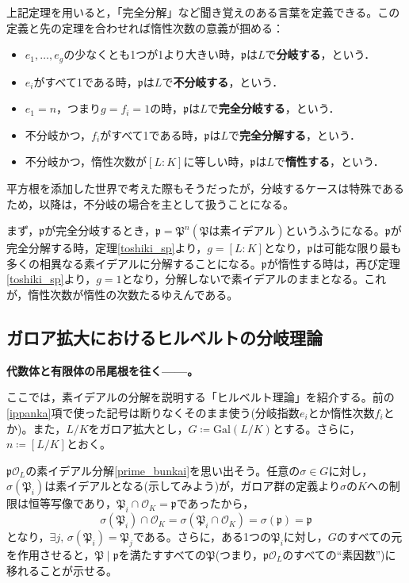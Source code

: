 上記定理を用いると，「完全分解」など聞き覚えのある言葉を定義できる。この定義と先の定理を合わせれば惰性次数の意義が掴める：
\begin{dfn}[聞き覚えのある用語 ＋「分岐」]
    \begin{itemize}
        \item $e_1,\ldots,e_g$の少なくとも1つが1より大きい時，$\mathfrak{p}$は$L$で\textbf{分岐する}，という．
        \item $e_i$がすべて1である時，$\mathfrak{p}$は$L$で\textbf{不分岐する}，という．
        \item $e_1=n$，つまり$g=f_i=1$の時，$\mathfrak{p}$は$L$で\textbf{完全分岐する}，という．
        \item 不分岐かつ，$f_i$がすべて1である時，$\mathfrak{p}$は$L$で\textbf{完全分解する}，という．
        \item 不分岐かつ，惰性次数が$[L:K]$に等しい時，$\mathfrak{p}$は$L$で\textbf{惰性する}，という．
    \end{itemize}
\end{dfn}
平方根を添加した世界で考えた際もそうだったが，分岐するケースは特殊であるため，以降は，不分岐の場合を主として扱うことになる。

まず，$\mathfrak{p}$が完全分岐するとき，$\mathfrak{p}=\mathfrak{P}^{n}(\mathfrak{P}\text{は素イデアル})$というふうになる。$\mathfrak{p}$が完全分解する時，定理\ref{toshiki_sp}より，$g=[L:K]$となり，$\mathfrak{p}$は可能な限り最も多くの相異なる素イデアルに分解することになる。$\mathfrak{p}$が惰性する時は，再び定理\ref{toshiki_sp}より，$g=1$となり，分解しないで素イデアルのままとなる。これが，惰性次数が惰性の次数たるゆえんである。

\subsection{ガロア拡大におけるヒルベルトの分岐理論}
\textbf{代数体と有限体の吊尾根を往く------。}

\vspace{10pt}

ここでは，素イデアルの分解を説明する「ヒルベルト理論」を紹介する。前の\ref{ippanka}項で使った記号は断りなくそのまま使う(分岐指数$e_i$とか惰性次数$f_i$とか)。また，$L/K$をガロア拡大とし，$G\coloneqq\mathrm{Gal}(L/K)$とする。さらに，$n\coloneqq [L/K]$とおく。

$\mathfrak{p}\mathcal{O}_L$の素イデアル分解\eqref{prime_bunkai}を思い出そう。任意の$\sigma\in G$に対し，$\sigma(\mathfrak{P}_i)$は素イデアルとなる(示してみよう)が，ガロア群の定義より$\sigma$の$K$への制限は恒等写像であり，$\mathfrak{P}_i\cap\mathcal{O}_K=\mathfrak{p}$であったから，\[
\sigma(\mathfrak{P}_i)\cap\mathcal{O}_K=\sigma(\mathfrak{P}_i\cap\mathcal{O}_K)=\sigma(\mathfrak{p})=\mathfrak{p}
\]となり，$\exists j,\,\sigma(\mathfrak{P}_i)=\mathfrak{P}_j$である。さらに，ある1つの$\mathfrak{P}_i$に対し，$G$のすべての元を作用させると，$\mathfrak{P}\mid\mathfrak{p}$を満たすすべての$\mathfrak{P}$(つまり，$\mathfrak{p}\mathcal{O}_L$のすべての``素因数'')に移れることが示せる。

